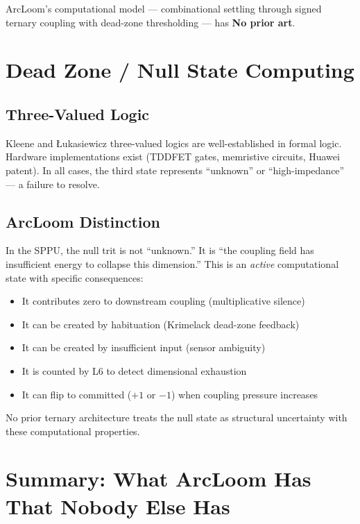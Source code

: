 \documentclass[11pt, a4paper]{article}
\newcommand{\nopriorart}{\textcolor{gap-red}{\textbf{No prior art}}}
\begin{document}
ArcLoom's computational model --- combinational settling through
signed ternary coupling with dead-zone thresholding --- has
\nopriorart.

\section{Dead Zone / Null State Computing}

\subsection{Three-Valued Logic}

Kleene and \L ukasiewicz three-valued logics are well-established in
formal logic. Hardware implementations exist (TDDFET gates, memristive
circuits, Huawei patent). In all cases, the third state represents
``unknown'' or ``high-impedance'' --- a failure to resolve.

\subsection{ArcLoom Distinction}

In the SPPU, the null trit is not ``unknown.'' It is ``the coupling
field has insufficient energy to collapse this dimension.'' This is
an \textit{active} computational state with specific consequences:

\begin{itemize}[nosep]
  \item It contributes zero to downstream coupling (multiplicative silence)
  \item It can be created by habituation (Krimelack dead-zone feedback)
  \item It can be created by insufficient input (sensor ambiguity)
  \item It is counted by L6 to detect dimensional exhaustion
  \item It can flip to committed ($+1$ or $-1$) when coupling pressure
        increases
\end{itemize}

No prior ternary architecture treats the null state as structural
uncertainty with these computational properties.

\section{Summary: What ArcLoom Has That Nobody Else Has}
\end{document}
